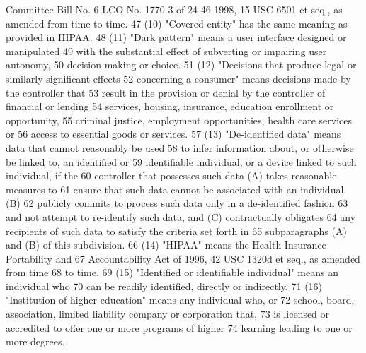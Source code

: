 Committee Bill No. 6
LCO No. 1770 3 of 24
46 1998, 15 USC 6501 et seq., as amended from time to time.
47 (10) "Covered entity" has the same meaning as provided in HIPAA.
48 (11) "Dark pattern" means a user interface designed or manipulated
49 with the substantial effect of subverting or impairing user autonomy,
50 decision-making or choice.
51 (12) "Decisions that produce legal or similarly significant effects
52 concerning a consumer" means decisions made by the controller that
53 result in the provision or denial by the controller of financial or lending
54 services, housing, insurance, education enrollment or opportunity,
55 criminal justice, employment opportunities, health care services or
56 access to essential goods or services.
57 (13) "De-identified data" means data that cannot reasonably be used
58 to infer information about, or otherwise be linked to, an identified or
59 identifiable individual, or a device linked to such individual, if the
60 controller that possesses such data (A) takes reasonable measures to
61 ensure that such data cannot be associated with an individual, (B)
62 publicly commits to process such data only in a de-identified fashion
63 and not attempt to re-identify such data, and (C) contractually obligates
64 any recipients of such data to satisfy the criteria set forth in
65 subparagraphs (A) and (B) of this subdivision.
66 (14) "HIPAA" means the Health Insurance Portability and
67 Accountability Act of 1996, 42 USC 1320d et seq., as amended from time
68 to time.
69 (15) "Identified or identifiable individual" means an individual who
70 can be readily identified, directly or indirectly.
71 (16) "Institution of higher education" means any individual who, or
72 school, board, association, limited liability company or corporation that,
73 is licensed or accredited to offer one or more programs of higher
74 learning leading to one or more degrees.

